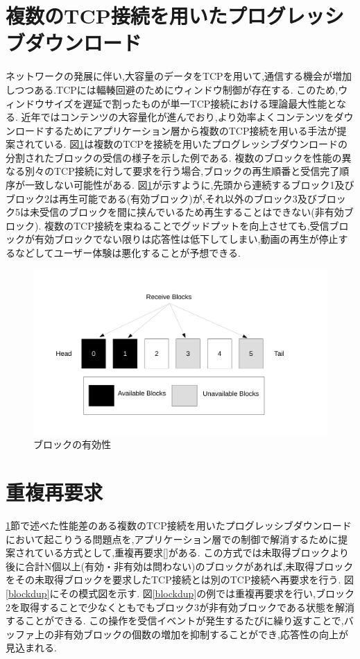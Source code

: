 \documentclass[a4j,12pt]{gradthesis_utf8}
\begin{document}
\newpage


 \section{複数のTCP接続を用いたプログレッシブダウンロード}
 \label{hukusu}
 ネットワークの発展に伴い,大容量のデータをTCPを用いて,通信する機会が増加しつつある.TCPには輻輳回避のためにウィンドウ制御が存在する.
 このため,ウィンドウサイズを遅延で割ったものが単一TCP接続における理論最大性能となる.
 近年ではコンテンツの大容量化が進んでおり,より効率よくコンテンツをダウンロードするためにアプリケーション層から複数のTCP接続を用いる手法が提案されている.
 図\ref{block}は複数のTCPを接続を用いたプログレッシブダウンロードの分割されたブロックの受信の様子を示した例である.
 複数のブロックを性能の異なる別々のTCP接続に対して要求を行う場合,ブロックの再生順番と受信完了順序が一致しない可能性がある.
 図\ref{block}が示すように,先頭から連続するブロック1及びブロック2は再生可能である(有効ブロック)が,それ以外のブロック3及びブロック5は未受信のブロックを間に挟んでいるため再生することはできない(非有効ブロック).
 複数のTCP接続を束ねることでグッドプットを向上させても,受信ブロックが有効ブロックでない限りは応答性は低下してしまい,動画の再生が停止するなどしてユーザー体験は悪化することが予想できる.
\begin{figure}[h]
\centering
\includegraphics[width=18cm]{figure/block.pdf}
\caption{ブロックの有効性}
\label{block}
\end{figure}

 \section{重複再要求}
 \label{juhuku}
 \ref{hukusu}節で述べた性能差のある複数のTCP接続を用いたプログレッシブダウンロードにおいて起こりうる問題点を,アプリケーション層での制御で解消するために提案されている方式として,重複再要求[]がある.
 この方式では未取得ブロックより後に合計N個以上(有効・非有効は問わない)のブロックがあれば,未取得ブロックをその未取得ブロックを要求したTCP接続とは別のTCP接続へ再要求を行う.
 図\ref{blockdup}にその模式図を示す.
 図\ref{blockdup}の例では重複再要求を行い,ブロック2を取得することで少なくともでもブロック3が非有効ブロックである状態を解消することができる.
 この操作を受信イベントが発生するたびに繰り返すことで,バッファ上の非有効ブロックの個数の増加を抑制することができ,応答性の向上が見込まれる.
 
\end{document}
